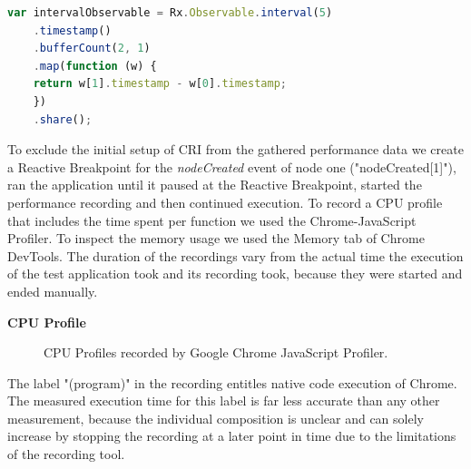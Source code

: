 	\begin{lstlisting}[language=JavaScript, caption={Example of RxJS code.},label={lst:performanceTestExtract}]
	var intervalObservable = Rx.Observable.interval(5)
	.timestamp()
	.bufferCount(2, 1)
	.map(function (w) {
	return w[1].timestamp - w[0].timestamp;
	})
	.share();	
	\end{lstlisting}

	To exclude the initial setup of CRI from the gathered performance data we create a Reactive Breakpoint for the \emph{nodeCreated} event of node one ("nodeCreated[1]"), ran the application until it paused at the Reactive Breakpoint, started the performance recording and then continued execution. To record a CPU profile that includes the time spent per function we used the Chrome-JavaScript Profiler. To inspect the memory usage we used the Memory tab of Chrome DevTools. The duration of the recordings vary from the actual time the execution of the test application took and its recording took, because they were started and ended manually. 
	
	\textbf{CPU Profile}
	\begin{figure}[!h]
	\centering
	\hfill
	\caption{CPU Profiles recorded by Google Chrome JavaScript Profiler.}
	\end{figure}
	
	The label "(program)" in the recording entitles native code execution of Chrome. The measured execution time for this label is far less accurate than any other measurement, because the individual composition is unclear and can solely increase by stopping the recording at a later point in time due to the limitations of the recording tool.
	
